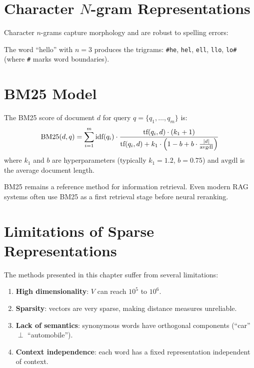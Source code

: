 \section{Character $N$-gram Representations}
\label{sec:rep:char}

Character $n$-grams capture morphology and are robust to spelling errors:

\begin{example}
The word ``hello'' with $n=3$ produces the trigrams:
\texttt{\#he}, \texttt{hel}, \texttt{ell}, \texttt{llo}, \texttt{lo\#}
(where \texttt{\#} marks word boundaries).
\end{example}

\section{BM25 Model}
\label{sec:rep:bm25}

\begin{definition}[BM25]
The BM25 score of document $d$ for query $q = \{q_1, \ldots, q_m\}$ is:
\[
\text{BM25}(d, q) = \sum_{i=1}^{m} \text{idf}(q_i) \cdot
\frac{\text{tf}(q_i, d) \cdot (k_1 + 1)}{\text{tf}(q_i, d) + k_1 \cdot \left(1 - b + b \cdot \frac{\left| d \right|}{\text{avgdl}}\right)}
\]
where $k_1$ and $b$ are hyperparameters (typically $k_1 = 1.2$, $b = 0.75$)
and $\text{avgdl}$ is the average document length.
\end{definition}

\begin{bestpractice}[title=\textbf{BM25 in practice}]
BM25 remains a reference method for information retrieval. Even modern RAG
systems often use BM25 as a first retrieval stage before neural reranking.
\end{bestpractice}

\section{Limitations of Sparse Representations}
\label{sec:rep:limits}

The methods presented in this chapter suffer from several limitations:

\begin{enumerate}
    \item \textbf{High dimensionality}: $V$ can reach $10^5$ to $10^6$.
    \item \textbf{Sparsity}: vectors are very sparse, making distance measures
          unreliable.
    \item \textbf{Lack of semantics}: synonymous words have orthogonal
          components (``car'' $\perp$ ``automobile'').
    \item \textbf{Context independence}: each word has a fixed representation
          independent of context.
\end{enumerate}

